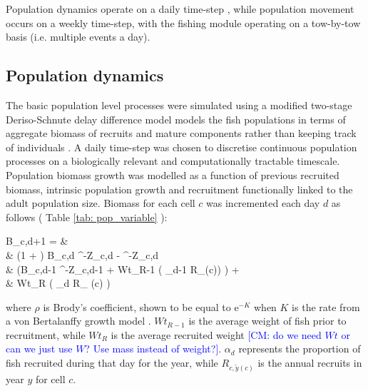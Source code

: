 \documentclass[review]{elsarticle}
\let\oldequation\equation
\let\oldendequation\endequation
\renewenvironment{equation}
 {\linenomathNonumbers\oldequation}
 {\oldendequation\endlinenomath}
\begin{document}
Population dynamics 
operate on a daily time-step , while population movement occurs
on a weekly time-step, with the fishing module operating on a tow-by-tow basis
(i.e.\added{,} multiple events a day). \\

\subsection{Population dynamics}

The basic population level processes were simulated using a modified two-stage
Deriso-Schnute delay difference model  models the fish populations in
terms of aggregate biomass of recruits and mature components rather than
keeping track of individuals \citep{Deriso1980, Schnute1985, Dichmont2003}. A
daily time-step was chosen to discretise continuous population processes on a
biologically relevant and computationally tractable timescale. Population
biomass growth was modelled as a function of previous recruited biomass,
intrinsic population growth and recruitment functionally linked to the adult
population size.  Biomass for each cell $c$ was incremented each day $d$ as
follows ( Table \ref{tab: pop_variable} ): 
\begin{equation}
	\begin{split}
	B_{c,d+1} = &\\
	& \left(1 + \rho \right) B_{c,d} \cdot {}^{-Z_{c,d}} - \rho \cdot
	^{-Z_{c,d}} \hspace{2.9cm}
	\times \\  
	& \left(B_{c,d-1} \cdot {}^{-Z_{c,d-1}} + Wt_{R-1} \cdot \left( \alpha_{d-1} \cdot
	R_{\left(c\right)}\right) \right)
	\hspace{0.9cm} + \\
	& Wt_{R} \cdot \left( \alpha_{d} \cdot R_{ \left(c\right)}
	\right) \\
	\end{split}
\end{equation}
where $\rho$ is Brody's coefficient, shown to be equal to $\mathrm{e}^{-K}$
when $K$ is the rate  from a von Bertalanffy growth model
\citep{Schnute1985}. $Wt_{R-1}$ is the average weight of fish prior to
recruitment, while $Wt_{R}$ is the average recruited weight \textcolor{blue}{[CM: do we need $Wt$ or can we just use $W$? Use mass instead of weight?]}. $\alpha_{d}$
represents the proportion of fish recruited during that day for the year, while
$R_{c,\tilde{y}(c)}$ is the annual recruits in year $y$ for cell $c$. \\
\end{document}
